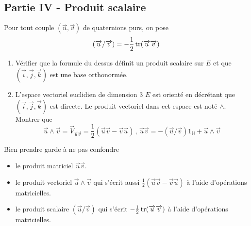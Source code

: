 \subsection*{Partie IV - Produit scalaire}
Pour tout couple $(\overrightarrow{u},\overrightarrow{v})$ de quaternions purs, on pose
\[(\overrightarrow{u}/\overrightarrow{v})=-\frac{1}{2}\operatorname{tr} ( \overrightarrow{u}\overrightarrow{v})\]
\begin{enumerate}
\item Vérifier que la formule du dessus définit un produit scalaire sur $E$ et que $(\overrightarrow{i}, \overrightarrow{j},\overrightarrow{k})$ est une base orthonormée.

\item L'espace vectoriel euclidien de dimension 3 $E$ est orienté en décrétant que $(\overrightarrow{i}, \overrightarrow{j},\overrightarrow{k})$ est directe. Le produit vectoriel dans cet espace est noté $\wedge$. Montrer que
\[\overrightarrow{u}\wedge\overrightarrow{v}=\overrightarrow{V}_{\overrightarrow{u}\overrightarrow{v}}=\frac{1}{2}(\overrightarrow{u}\overrightarrow{v}-\overrightarrow{v}\overrightarrow{u})\, , \, \overrightarrow{u}\overrightarrow{v} = -(\overrightarrow{u}/\overrightarrow{v})1_{\mathbb{H}} + \overrightarrow{u}\wedge\overrightarrow{v}\]
\end{enumerate}

Bien prendre garde à ne pas confondre
\begin{itemize}
\item le produit matriciel $\overrightarrow{u}\overrightarrow{v}$.
\item le produit vectoriel $\overrightarrow{u}\wedge\overrightarrow{v}$ qui s'écrit aussi $\frac{1}{2}(\overrightarrow{u}\overrightarrow{v}-\overrightarrow{v}\overrightarrow{u})$ à l'aide d'opérations matricielles.
\item le produit scalaire $(\overrightarrow{u} / \overrightarrow{v})$ qui s'écrit $-\frac{1}{2}\operatorname{tr} (\overrightarrow{u}\overrightarrow{v})$ à l'aide d'opérations matricielles.
\end{itemize}

